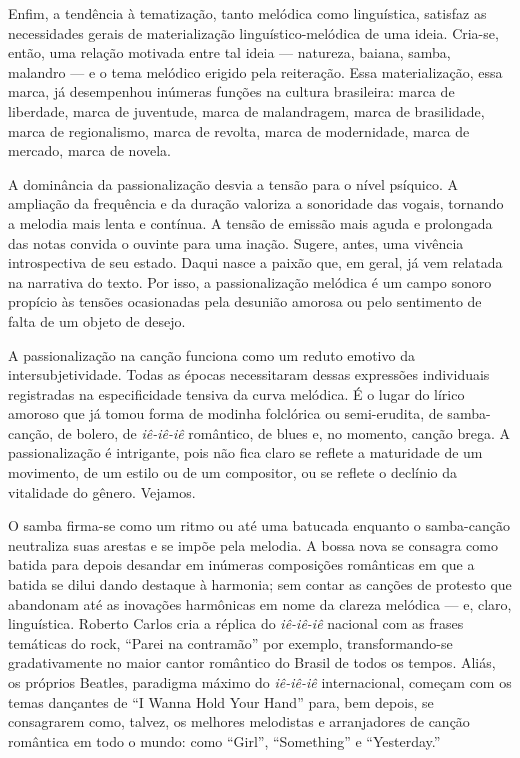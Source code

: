 Enfim, a
tendência à tematização, tanto melódica como linguística, satisfaz as
necessidades gerais de materialização linguístico-melódica de uma
ideia. Cria-se, então, uma relação motivada entre tal ideia --- natureza,
baiana, samba, malandro --- e o tema melódico erigido pela reiteração. Essa
materialização, essa marca, já desempenhou inúmeras funções na cultura
brasileira: marca de liberdade, marca de juventude, marca de
malandragem, marca de brasilidade, marca de regionalismo, marca de
revolta, marca de modernidade, marca de mercado, marca de novela.

A dominância da passionalização desvia a tensão para o nível psíquico. A
ampliação da frequência e da duração valoriza a sonoridade das vogais,
tornando a melodia mais lenta e contínua. A tensão de emissão mais aguda
e prolongada das notas convida o ouvinte para uma inação. Sugere, antes,
uma vivência introspectiva de seu estado. Daqui nasce a paixão que, em
geral, já vem relatada na narrativa do texto. Por isso, a
passionalização melódica é um campo sonoro propício às tensões
ocasionadas pela desunião amorosa ou pelo sentimento de falta de um
objeto de desejo.

A passionalização na canção funciona como um reduto emotivo da
intersubjetividade. Todas as épocas necessitaram dessas expressões
individuais registradas na especificidade tensiva da curva melódica. É o
lugar do lírico amoroso que já tomou forma de modinha folclórica ou
semi-erudita, de samba-canção, de bolero, de \textit{iê-iê-iê} romântico, de blues
e, no momento, canção brega. A passionalização é intrigante, pois não
fica claro se reflete a maturidade de um movimento, de um estilo ou de
um compositor, ou se reflete o declínio da vitalidade do gênero.
Vejamos.

O samba firma-se como um ritmo ou até uma batucada enquanto o
samba-canção neutraliza suas arestas e se impõe pela melodia. A bossa
nova se consagra como batida para depois desandar em inúmeras
composições românticas em que a batida se dilui dando destaque à
harmonia; sem contar as canções de protesto que abandonam até as
inovações harmônicas em nome da clareza melódica --- e, claro,
linguística. Roberto Carlos cria a réplica do \textit{iê-iê-iê} nacional com as
frases temáticas do rock, ``Parei na contramão'' por exemplo,
transformando-se gradativamente no maior cantor romântico do Brasil de
todos os tempos. Aliás, os próprios Beatles, paradigma máximo do
\textit{iê-iê-iê} internacional, começam com os temas dançantes de ``I Wanna Hold
Your Hand'' para, bem depois, se consagrarem como, talvez, os melhores
melodistas e arranjadores de canção romântica em todo o mundo: como ``Girl'',
``Something'' e ``Yesterday.''

